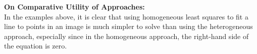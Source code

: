 \begin{problem}
\begin{enumroman}
\begin{answer}
        \step
        \textbf{On Comparative Utility of Approaches:}\\
        In the examples above, it is clear that using homogeneous least squares
        to fit a line to points in an image is much simpler to solve than
        using the heterogeneous approach,
        especially since in the homogeneous approach, the right-hand side
        of the equation is zero.
      \end{answer}
  \end{enumroman}
\end{problem}
